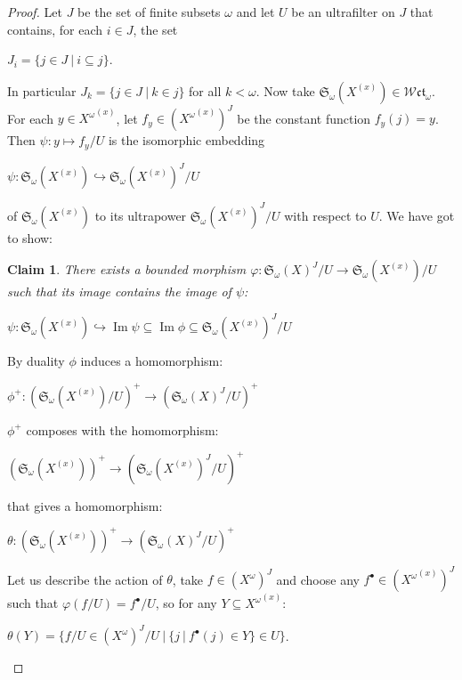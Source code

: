 \documentclass{article}
\theoremstyle{defin}
\theoremstyle{theorem}
\theoremstyle{claim}
\newtheorem{claim}{Claim}
\theoremstyle{prop}
\theoremstyle{lemma}
\theoremstyle{fact}
\theoremstyle{remark}
\theoremstyle{ex}
\theoremstyle{col}
\theoremstyle{question}
\begin{document}
\begin{proof}
Let $J$ be the set of finite subsets $\omega$ and let $U$ be an ultrafilter on $J$ that contains, 
for each $i \in J$, the set
\begin{center}
$J_i = \{ j \in J \: | \: i \subseteq j \}$.
\end{center}
In particular $J_k = \{ j \in J \: | \: k \in j \}$ for all $k < \omega$. 
Now take $\mathfrak{S}_{\omega}(X^{(x)}) \in \mathcal{W}\mathfrak{ct}_{\omega}$.
For each $y \in {X^{\omega}}^{(x)}$, let $f_y \in ({X^{\omega}}^{(x)})^{J}$ be the constant 
function $f_y(j) = y$. Then $\psi : y \mapsto f_y / U$ is the isomorphic embedding
\begin{center}
$\psi : \mathfrak{S}_{\omega}(X^{(x)}) \hookrightarrow \mathfrak{S}_{\omega}{(X^{(x)})}^J/U$
\end{center}
of $\mathfrak{S}_{\omega}(X^{(x)})$ to its ultrapower $\mathfrak{S}_{\omega}(X^{(x)})^J/U$ with respect to $U$. We have got to show:
\begin{claim} \label{claim}
There exists a bounded morphism $\varphi : \mathfrak{S}_{\omega}{(X)}^J/U \to \mathfrak{S}_{\omega}(X^{(x)})/U$ 
such that its image contains the image of $\psi$:
\begin{center}
$\psi : \mathfrak{S}_{\omega}(X^{(x)}) \hookrightarrow \operatorname{Im}\psi \subseteq \operatorname{Im}\phi \subseteq \mathfrak{S}_{\omega}{(X^{(x)})}^J / U $
\end{center}
\end{claim}

By duality $\phi$ induces a homomorphism:
\begin{center}
$\phi^+ : {(\mathfrak{S}_{\omega}(X^{(x)})/U)}^+ \to {(\mathfrak{S}_{\omega}{(X)}^J/U)}^+$
\end{center}
$\phi^+$ composes with the homomorphism:
\begin{center}
${(\mathfrak{S}_{\omega}(X^{(x)}))}^+ \to {(\mathfrak{S}_{\omega}{(X^{(x)})}^J/U)}^+$
\end{center}
that gives a homomorphism:
\begin{center}
$\theta : {(\mathfrak{S}_{\omega}(X^{(x)}))}^+ \to {(\mathfrak{S}_{\omega}{(X)}^J/U)}^+$
\end{center}
Let us describe the action of $\theta$, take $f \in {(X^{\omega})}^J$ and choose any 
$f^{\bullet} \in {({X^{\omega}}^{(x)})}^J$ such that $\varphi(f/U) = f^{\bullet}/U$, 
so for any $Y \subseteq {X^{\omega}}^{(x)}$:
\begin{center}
$\theta(Y) = \{ f/U \in {(X^{\omega})}^J/U \: | \: \{ j \: | \: f^{\bullet}(j) \in Y \} \in U \}$.
\end{center}


\end{proof}
\end{document}
